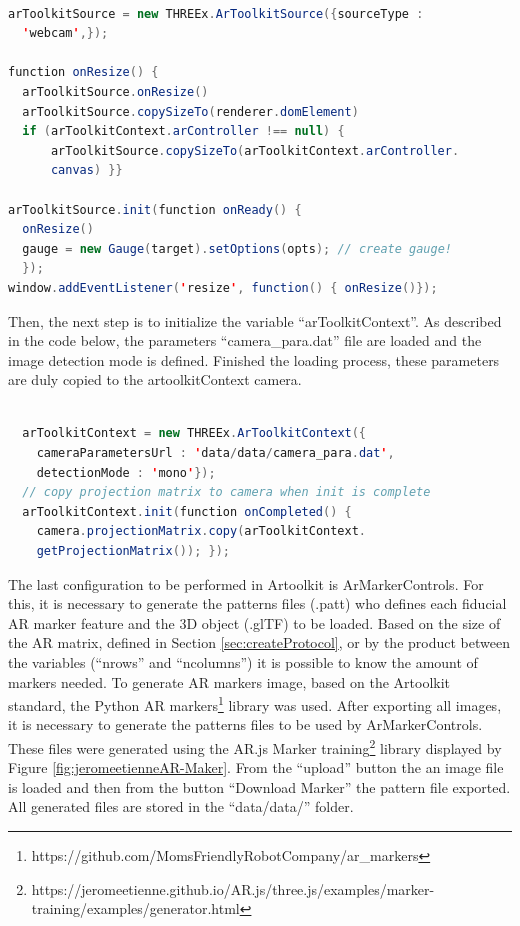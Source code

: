 \begin{lstlisting}[frame=single,language=Java]  % Start your code-block

arToolkitSource = new THREEx.ArToolkitSource({sourceType : 
  'webcam',});

function onResize() {
  arToolkitSource.onResize()
  arToolkitSource.copySizeTo(renderer.domElement)
  if (arToolkitContext.arController !== null) {
      arToolkitSource.copySizeTo(arToolkitContext.arController.
      canvas) }}

arToolkitSource.init(function onReady() {
  onResize()
  gauge = new Gauge(target).setOptions(opts); // create gauge!
  });
window.addEventListener('resize', function() { onResize()});

\end{lstlisting}

Then, the next step is to initialize the variable ``arToolkitContext''. As described in the code below, the parameters ``camera\_para.dat'' file are loaded and the image detection mode is defined. Finished the loading process, these parameters are duly copied to the artoolkitContext camera. \newline

\begin{lstlisting}[frame=single,language=Java]  % Start your code-block

  arToolkitContext = new THREEx.ArToolkitContext({
    cameraParametersUrl : 'data/data/camera_para.dat',
    detectionMode : 'mono'});
  // copy projection matrix to camera when init is complete
  arToolkitContext.init(function onCompleted() {
    camera.projectionMatrix.copy(arToolkitContext.
    getProjectionMatrix()); });
\end{lstlisting}

The last configuration to be performed in Artoolkit is ArMarkerControls. For this, it is necessary to generate the patterns files (.patt) who defines each fiducial AR marker feature and the 3D object (.glTF) to be loaded. Based on the size of the AR matrix, defined in Section \ref{sec:createProtocol}, or by the product between the variables (``nrows'' and ``ncolumns'') it is possible to know the amount of markers needed. To generate  AR markers image, based on the Artoolkit standard, the Python AR markers\footnote{https://github.com/MomsFriendlyRobotCompany/ar\_markers} library was used. After exporting all images, it is necessary to generate the patterns files to be used by ArMarkerControls. These files were generated using the AR.js Marker training\footnote{https://jeromeetienne.github.io/AR.js/three.js/examples/marker-training/examples/generator.html} library displayed by Figure \ref{fig:jeromeetienneAR-Maker}. From the ``upload'' button the an image file is loaded and then from the button ``Download Marker'' the pattern file exported. All generated files are stored in the ``data/data/'' folder.

